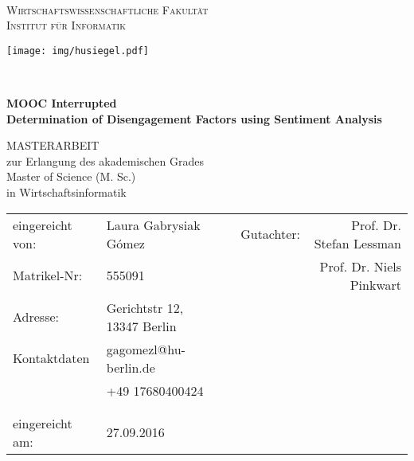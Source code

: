 \documentclass[
	a4paper,
	pdftex,
	12pt,	
	footinclude=true,
	fleqn,
	final,
	]{report}%
\newcommand{\hsc}[1]{{\large\MakeUppercase{#1}}}
\begin{document}
\begin{titlepage}
		\thispagestyle{empty}	
		\begin{minipage}[c][3cm][c]{12cm}
			\textsc{
				\hspace{-0.4mm}{\Large Humboldt Universität zu Berlin}\\
				\normalsize {Wirtschaftswissen­schaftliche Fakultät\\Institut für Informatik}}
		\end{minipage}
	\hfill
		\begin{minipage}[c][3cm][c]{3cm}
			\texttt{[image: img/husiegel.pdf]}
		\end{minipage}\\
	\vspace{0.7cm}
	\sffamily
		\begin{center}
			\vspace{\baselineskip}
			{\LARGE \textbf{MOOC Interrupted \\ Determination of Disengagement Factors using Sentiment Analysis}}\\
			{\Large
			\vspace{0.7cm}
				
				\hsc{Masterarbeit}\\%
				zur Erlangung des akademischen Grades\\
				Master of Science (M. Sc.)\\ \vspace{0.4cm}
				in Wirtschaftsinformatik
				}
		\end{center}
	\vfill
		\begin{flushleft}\normalsize
		\begin{tabular}[h!]{llcrr}%
		eingereicht von:& Laura Gabrysiak G\'{o}mez	& &Gutachter:	&Prof. Dr. Stefan Lessman \\
		Matrikel-Nr:	& 555091			& &		&Prof. Dr. Niels Pinkwart \\
		Adresse:	& Gerichtstr 12, 13347 Berlin	& &		& 	\\
		Kontaktdaten	& gagomezl@hu-berlin.de		& &		& 	\\
				& +49 17680400424	&	& &\\
				&			& 	& &\\
				&			& 	& &\\				
		eingereicht am:	& 27.09.2016		&	& &\\%
		\end{tabular}
		\end{flushleft}
\end{titlepage}
\end{document}
